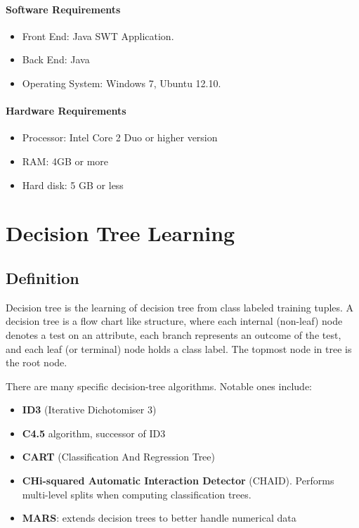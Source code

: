 \documentclass[12pt]{report}
\begin{document}
\subsubsection{Software Requirements}
\begin{itemize}

\item{	Front End: Java SWT Application.}
\item{	Back End: Java}
\item{	Operating System: Windows 7, Ubuntu 12.10.}

\end{itemize}

\subsubsection{Hardware Requirements}
\begin{itemize}
\item{Processor: Intel Core 2 Duo or higher version}
\item{RAM: 4GB or more}
\item{Hard disk: 5 GB or less}
\end{itemize}

%
\pagestyle{fancy}
\chead{}
\rfoot{\small{\thepage}}
\renewcommand{\headrulewidth}{0.4pt}
\renewcommand{\footrulewidth}{0.4pt}
\chapter{Decision Tree Learning}

\section{Definition}


Decision tree is the learning of decision tree from class labeled training tuples. A decision tree is a flow chart like structure, where each internal (non-leaf) node denotes a test on an attribute, each branch represents an outcome of the test, and each leaf (or terminal) node holds a class label. The topmost node in tree is the root node.

There are many specific decision-tree algorithms. Notable ones include:

\begin{itemize}
\item{\textbf{ID3} (Iterative Dichotomiser 3)}
\item{\textbf{C4.5} algorithm, successor of ID3}
\item{\textbf{CART} (Classification And Regression Tree)}
\item{\textbf{CHi-squared Automatic Interaction Detector }(CHAID). Performs multi-level splits when computing classification trees.}
\item{\textbf{MARS}: extends decision trees to better handle numerical data}
\end{itemize}
\end{document}
